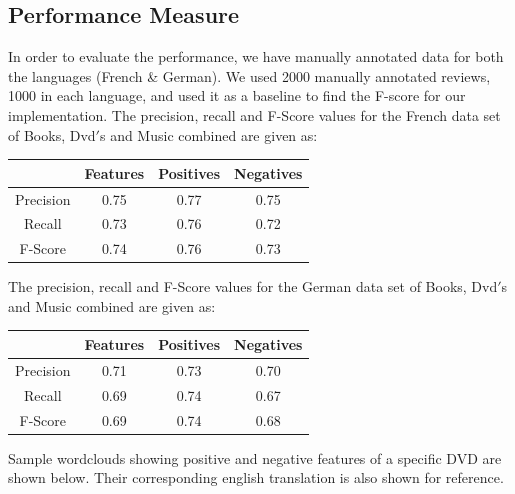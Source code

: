 \documentclass[conference]{IEEEtran}
\begin{document}
\subsection{\textbf{Performance Measure}}
\indent In order to evaluate the performance, we have manually annotated data for both the languages (French \& German). We used 2000 manually annotated reviews, 1000 in each language, and used it as a baseline to find the F-score for our implementation. 
The precision, recall and F-Score values for the French data set of Books, Dvd$'$s and Music combined are given as:
\begin{center}
\begin{tabular}{ |c|c|c|c|  }
 \hline
 & Features & Positives & Negatives\\
 \hline
 Precision & 0.75 & 0.77 & 0.75\\
Recall & 0.73 & 0.76 & 0.72\\
F-Score & 0.74 & 0.76 & 0.73\\
 \hline
\end{tabular}
\end{center}
\indent The precision, recall and F-Score values for the German data set of Books, Dvd$'$s and Music combined are given as:
\begin{center}
\begin{tabular}{ |c|c|c|c|  }
 \hline
 & Features & Positives & Negatives\\
 \hline
 Precision & 0.71 & 0.73 & 0.70\\
Recall & 0.69 & 0.74 & 0.67\\
F-Score & 0.69 & 0.74 & 0.68\\
 \hline
\end{tabular}
\end{center}
Sample wordclouds showing positive and negative features of a specific DVD  are shown below. Their corresponding english translation is also shown for reference.
\end{document}
